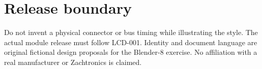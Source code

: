 \documentclass[10pt]{article}
\begin{document}
\section*{Release boundary}
Do not invent a physical connector or bus timing while illustrating the style. The actual module release must follow LCD-001.
\vfill
{\small\color{Muted}Identity and document language are original fictional design proposals for the Blender-8 exercise. No affiliation with a real manufacturer or Zachtronics is claimed.}
\end{document}
